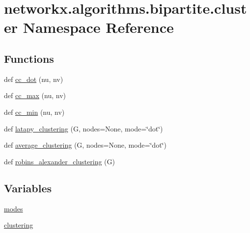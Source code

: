 \hypertarget{namespacenetworkx_1_1algorithms_1_1bipartite_1_1cluster}{}\section{networkx.\+algorithms.\+bipartite.\+cluster Namespace Reference}
\label{namespacenetworkx_1_1algorithms_1_1bipartite_1_1cluster}
\subsection*{Functions}
\begin{DoxyCompactItemize}
\item 
def \hyperlink{namespacenetworkx_1_1algorithms_1_1bipartite_1_1cluster_aa8749b5dca0aa1986e505e83d0bb90d7}{cc\+\_\+dot} (nu, nv)
\item 
def \hyperlink{namespacenetworkx_1_1algorithms_1_1bipartite_1_1cluster_a9e4dfa9f96e78d01a636c30077695ed0}{cc\+\_\+max} (nu, nv)
\item 
def \hyperlink{namespacenetworkx_1_1algorithms_1_1bipartite_1_1cluster_a4b2c9f3a2966d57d22d6423b9caae820}{cc\+\_\+min} (nu, nv)
\item 
def \hyperlink{namespacenetworkx_1_1algorithms_1_1bipartite_1_1cluster_a0acdfbe5d1eb9935863043993b4457ba}{latapy\+\_\+clustering} (G, nodes=None, mode=\char`\"{}dot\char`\"{})
\item 
def \hyperlink{namespacenetworkx_1_1algorithms_1_1bipartite_1_1cluster_abb3b66d2c3871659c444861cc3180d65}{average\+\_\+clustering} (G, nodes=None, mode=\char`\"{}dot\char`\"{})
\item 
def \hyperlink{namespacenetworkx_1_1algorithms_1_1bipartite_1_1cluster_a360efe80c92355ee33929deeede41371}{robins\+\_\+alexander\+\_\+clustering} (G)
\end{DoxyCompactItemize}
\subsection*{Variables}
\begin{DoxyCompactItemize}
\item 
\hyperlink{namespacenetworkx_1_1algorithms_1_1bipartite_1_1cluster_aeaa4cba47a1e17135976292befc76a41}{modes}
\item 
\hyperlink{namespacenetworkx_1_1algorithms_1_1bipartite_1_1cluster_a25b46a756db8ff1a00af83d2282ccb1e}{clustering}
\end{DoxyCompactItemize}


